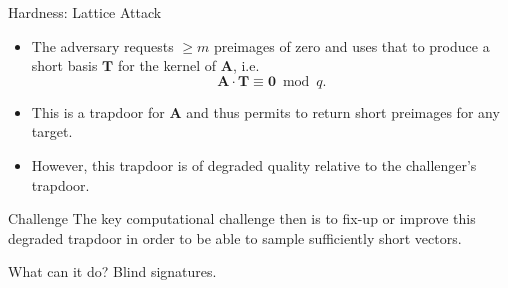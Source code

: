 \documentclass[xcolor=table,10pt,aspectratio=169]{beamer}
\renewcommand{\vec}[1]{\ensuremath{\mathbf{#1}}\xspace}
\providecommand{\mat}[1]{\ensuremath{\vec{#1}}\xspace}
\begin{document}
\begin{frame}[label={sec:orge403712}]{Hardness: Lattice Attack}
\begin{itemize}
\item The adversary requests \(\geq m\) preimages of zero and uses that to produce a short basis \(\mat{T}\) for the kernel of \(\mat{A}\), i.e. 
\[
  \mat{A}\cdot\mat{T} \equiv \vec{0} \bmod q.
  \]
\item This is a trapdoor for \(\mat{A}\) and thus permits to return short preimages for any target.
\item However, this trapdoor is of degraded quality relative to the challenger's trapdoor.
\end{itemize}

\begin{alertblock}{Challenge}
The key computational challenge then is to fix-up or improve this degraded trapdoor in order to be able to sample sufficiently short vectors.
\end{alertblock}
\end{frame}

\begin{frame}[label={sec:org1267961}]{What can it do?}
Blind signatures.
\end{frame}
\end{document}
